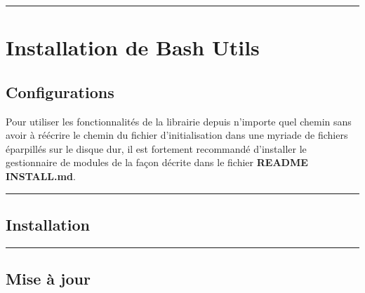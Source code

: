 \documentclass[a4paper,10pt]{article}
\begin{document}




\color{red}\par\noindent\rule{\textwidth}{0.4pt}\color{white}

\color{red}
\section{Installation de Bash Utils}\color{white}

\color{green}
\subsection{Configurations}\color{white}

\begin{justify}
    Pour utiliser les fonctionnalités de la librairie depuis n'importe quel chemin sans avoir à réécrire le chemin du fichier d'initialisation dans une myriade de fichiers éparpillés sur le disque dur, il est fortement recommandé d'installer le gestionnaire de modules de la façon décrite dans le fichier \textbf{\color{lime}README INSTALL.md}.
\end{justify}




\color{green}\par\noindent\rule{\textwidth}{0.4pt}\color{white}

\color{green}
\subsection{Installation}\color{white}

\begin{justify}

\end{justify}




\color{green}\par\noindent\rule{\textwidth}{0.4pt}\color{white}

\color{green}
\subsection{Mise à jour}\color{white}

\begin{justify}

\end{justify}
\end{document}
